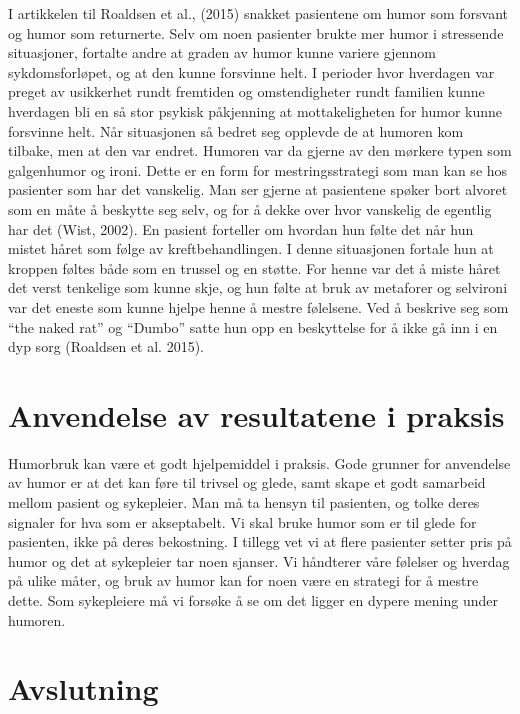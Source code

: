 I artikkelen til Roaldsen et al., (2015) snakket pasientene om humor som
forsvant og humor som returnerte. Selv om noen pasienter brukte mer humor i
stressende situasjoner, fortalte andre at graden av humor kunne variere gjennom
sykdomsforløpet, og at den kunne forsvinne helt. I perioder hvor hverdagen var
preget av usikkerhet rundt fremtiden og omstendigheter rundt familien kunne
hverdagen bli en så stor psykisk påkjenning at mottakeligheten for humor kunne
forsvinne helt. Når situasjonen så bedret seg opplevde de at humoren kom
tilbake, men at den var endret. Humoren var da gjerne av den mørkere typen som
galgenhumor og ironi.  Dette er en form for mestringsstrategi som man kan se
hos pasienter som har det vanskelig. Man ser gjerne at pasientene spøker bort
alvoret som en måte å beskytte seg selv, og for å dekke over hvor vanskelig de
egentlig har det (Wist, 2002). En pasient forteller om hvordan hun følte det
når hun mistet håret som følge av kreftbehandlingen. I denne situasjonen
fortale hun at kroppen føltes både som en trussel og en støtte. For henne var
det å miste håret det verst tenkelige som kunne skje, og hun følte at bruk av
metaforer og selvironi var det eneste som kunne hjelpe henne å mestre
følelsene. Ved å beskrive seg som “the naked rat” og “Dumbo” satte hun opp en
beskyttelse for å ikke gå inn i en dyp sorg (Roaldsen et al. 2015).

\chapter{Anvendelse av resultatene i praksis}

Humorbruk kan være et godt hjelpemiddel i praksis. Gode grunner for anvendelse
av humor er at det kan føre til trivsel og glede, samt skape et godt samarbeid
mellom pasient og sykepleier. Man må ta hensyn til pasienten, og tolke deres
signaler for hva som er akseptabelt. Vi skal bruke humor som er til glede for
pasienten, ikke på deres bekostning. I tillegg vet vi at flere pasienter setter
pris på humor og det at sykepleier tar noen sjanser. Vi håndterer våre følelser
og hverdag på ulike måter, og bruk av humor kan for noen være en strategi for å
mestre dette. Som sykepleiere må vi forsøke å se om det ligger en dypere mening
under humoren.

\chapter{Avslutning}

